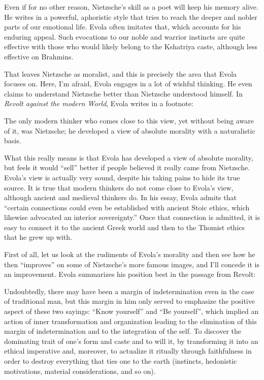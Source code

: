 Even if for no other reason, Nietzsche's skill as a poet will keep his memory alive. He writes in a powerful, aphoristic style that tries to reach the deeper and nobler parts of our emotional life. Evola often imitates that, which accounts for his enduring appeal. Such evocations to our noble and warrior instincts are quite effective with those who would likely belong to the Kshatriya caste, although less effective on Brahmins.

That leaves Nietzsche as moralist, and this is precisely the area that Evola focuses on. Here, I'm afraid, Evola engages in a lot of wishful thinking. He even claims to understand Nietzsche better than Nietzsche understood himself. In \emph{Revolt against the modern World}, Evola writes in a footnote:

\begin{quotex}
The only modern thinker who comes close to this view, yet without being aware of it, was Nietzsche; he developed a view of absolute morality with a naturalistic basis.
\end{quotex}


What this really means is that Evola has developed a view of absolute morality, but feels it would ``sell'' better if people believed it really came from Nietzsche. Evola's view is actually very sound, despite his taking pains to hide its true source. It is true that modern thinkers do not come close to Evola's view, although ancient and medieval thinkers do. In his essay, Evola admits that ``certain connections could even be established with ancient Stoic ethics, which likewise advocated an interior sovereignty.'' Once that connection is admitted, it is easy to connect it to the ancient Greek world and then to the Thomist ethics that he grew up with.

First of all, let us look at the rudiments of Evola's morality and then see how he then ``improves'' on some of Nietzsche's more famous images, and I'll concede it is an improvement. Evola summarizes his position best in the passage from Revolt:

\begin{quotex}
Undoubtedly, there may have been a margin of indetermination even in the case of traditional man, but this margin in him only served to emphasize the positive aspect of these two sayings: ``Know yourself'' and ``Be yourself'', which implied an action of inner transformation and organization leading to the elimination of this margin of indetermination and to the integration of the self. To discover the dominating trait of one's form and caste and to will it, by transforming it into an ethical imperative and, moreover, to actualize it ritually through faithfulness in order to destroy everything that ties one to the earth (instincts, hedonistic motivations, material considerations, and so on).
\end{quotex}


